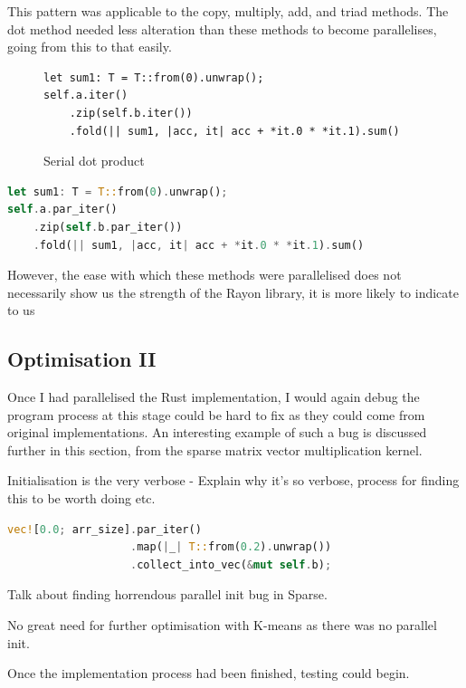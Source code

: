 This pattern was applicable to the copy, multiply, add, and triad methods. The dot method needed less alteration than these methods to become parallelises, going from this to that easily.
\begin{figure}[ht]
\begin{verbatim}
let sum1: T = T::from(0).unwrap();
self.a.iter()
    .zip(self.b.iter())
    .fold(|| sum1, |acc, it| acc + *it.0 * *it.1).sum()
\end{verbatim}
\caption{Serial dot product}
\end{figure}
\begin{lstlisting}[language=Rust]
let sum1: T = T::from(0).unwrap();
self.a.par_iter()
    .zip(self.b.par_iter())
    .fold(|| sum1, |acc, it| acc + *it.0 * *it.1).sum()
\end{lstlisting}
However, the ease with which these methods were parallelised does not necessarily show us the strength of the Rayon library, it is more likely to indicate to us

\subsection{Optimisation II}
Once I had parallelised the Rust implementation, I would again debug the program process at this stage could be hard to fix as they could come from original implementations. An interesting example of such a bug is discussed further in this section, from the sparse matrix vector multiplication kernel.

Initialisation is the very verbose - Explain why it's so verbose, process for finding this to be worth doing etc.
\begin{lstlisting}[language=Rust]
vec![0.0; arr_size].par_iter()
                   .map(|_| T::from(0.2).unwrap())
                   .collect_into_vec(&mut self.b);
\end{lstlisting}

Talk about finding horrendous parallel init bug in Sparse.

No great need for further optimisation with K-means as there was no parallel init.

Once the implementation process had been finished, testing could begin.

